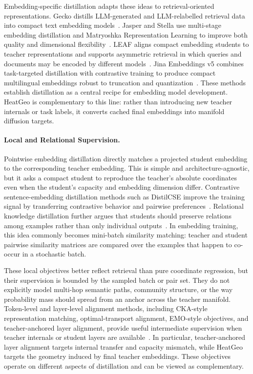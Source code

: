 Embedding-specific distillation adapts these ideas to retrieval-oriented representations. Gecko distills LLM-generated and LLM-relabelled retrieval data into compact text embedding models~\citep{lee2024gecko}. Jasper and Stella use multi-stage embedding distillation and Matryoshka Representation Learning to improve both quality and dimensional flexibility~\citep{zhang2024jasperstella}. LEAF aligns compact embedding students to teacher representations and supports asymmetric retrieval in which queries and documents may be encoded by different models~\citep{vujanic2025leaf}. Jina Embeddings v5 combines task-targeted distillation with contrastive training to produce compact multilingual embeddings robust to truncation and quantization~\citep{akram2026jinaembeddingsv5}. These methods establish distillation as a central recipe for embedding model development. HeatGeo is complementary to this line: rather than introducing new teacher internals or task labels, it converts cached final embeddings into manifold diffusion targets.

\paragraph{Local and Relational Supervision.}
Pointwise embedding distillation directly matches a projected student embedding to the corresponding teacher embedding. This is simple and architecture-agnostic, but it asks a compact student to reproduce the teacher's absolute coordinates even when the student's capacity and embedding dimension differ. Contrastive sentence-embedding distillation methods such as DistilCSE improve the training signal by transferring contrastive behavior and pairwise preferences~\citep{gao2021distilcse,xu2023distillcse}. Relational knowledge distillation further argues that students should preserve relations among examples rather than only individual outputs~\citep{park2019rkd}. In embedding training, this idea commonly becomes mini-batch similarity matching: teacher and student pairwise similarity matrices are compared over the examples that happen to co-occur in a stochastic batch.

These local objectives better reflect retrieval than pure coordinate regression, but their supervision is bounded by the sampled batch or pair set. They do not explicitly model multi-hop semantic paths, community structure, or the way probability mass should spread from an anchor across the teacher manifold. Token-level and layer-level alignment methods, including CKA-style representation matching, optimal-transport alignment, EMO-style objectives, and teacher-anchored layer alignment, provide useful intermediate supervision when teacher internals or student layers are available~\citep{kornblith2019similarity,alqahtani2021ot,dao2026talas}. In particular, teacher-anchored layer alignment targets internal transfer and capacity mismatch, while HeatGeo targets the geometry induced by final teacher embeddings. These objectives operate on different aspects of distillation and can be viewed as complementary.


